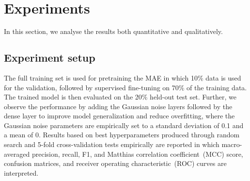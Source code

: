 \section{Experiments}\label{chapter_4:results}
In this section, we analyse the results both quantitative and qualitatively. 

\subsection{Experiment setup}
The full training set is used for pretraining the MAE in which 10\% data is used for the validation, followed by supervised fine-tuning on 70\% of the training data. The trained model is then evaluated on the 20\% held-out test set. Further, we observe the performance by adding the Gaussian noise layers followed by the dense layer to improve model generalization and reduce overfitting, where the Gaussian noise parameters are empirically set to a standard deviation of 0.1 and a mean of 0. Results based on best hyperparameters produced through random search and 5-fold cross-validation tests empirically are reported in which macro-averaged precision, recall, F1, and Matthias correlation coefficient~(MCC) score, confusion matrices, and receiver operating characteristic~(ROC) curves are interpreted.

